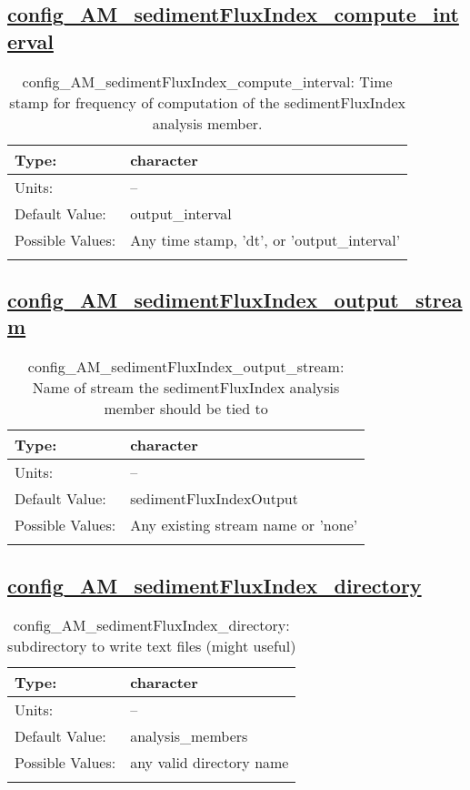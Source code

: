 \subsection[config\_AM\_sedimentFluxIndex\_compute\_interval]{\hyperref[sec:nm_tab_AM_sedimentFluxIndex]{config\_AM\_sedimentFluxIndex\_compute\_interval}}
\label{subsec:nm_sec_config_AM_sedimentFluxIndex_compute_interval}
\begin{center}
\begin{longtable}{| p{2.0in} || p{4.0in} |}
    \hline
    Type: & character \\
    \hline
    Units: & -- \\
    \hline
    Default Value: & output\_interval \\
    \hline
    Possible Values: & Any time stamp, 'dt', or 'output\_interval' \\
    \hline
    \caption{config\_AM\_sedimentFluxIndex\_compute\_interval: Time stamp for frequency of computation of the sedimentFluxIndex analysis member.}
\end{longtable}
\end{center}
\subsection[config\_AM\_sedimentFluxIndex\_output\_stream]{\hyperref[sec:nm_tab_AM_sedimentFluxIndex]{config\_AM\_sedimentFluxIndex\_output\_stream}}
\label{subsec:nm_sec_config_AM_sedimentFluxIndex_output_stream}
\begin{center}
\begin{longtable}{| p{2.0in} || p{4.0in} |}
    \hline
    Type: & character \\
    \hline
    Units: & -- \\
    \hline
    Default Value: & sedimentFluxIndexOutput \\
    \hline
    Possible Values: & Any existing stream name or 'none' \\
    \hline
    \caption{config\_AM\_sedimentFluxIndex\_output\_stream: Name of stream the sedimentFluxIndex analysis member should be tied to}
\end{longtable}
\end{center}
\subsection[config\_AM\_sedimentFluxIndex\_directory]{\hyperref[sec:nm_tab_AM_sedimentFluxIndex]{config\_AM\_sedimentFluxIndex\_directory}}
\label{subsec:nm_sec_config_AM_sedimentFluxIndex_directory}
\begin{center}
\begin{longtable}{| p{2.0in} || p{4.0in} |}
    \hline
    Type: & character \\
    \hline
    Units: & -- \\
    \hline
    Default Value: & analysis\_members \\
    \hline
    Possible Values: & any valid directory name \\
    \hline
    \caption{config\_AM\_sedimentFluxIndex\_directory: subdirectory to write text files (might useful)}
\end{longtable}
\end{center}
